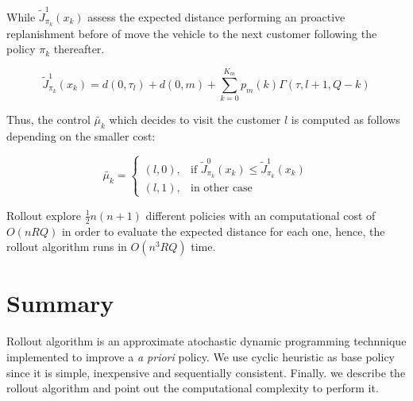 While $\tilde{J}^1_{\pi_k}(x_k)$ assess the expected distance performing an proactive replanishment before of move the vehicle to the next customer following the policy ${\pi_k}$ thereafter.

\begin{equation}\label{ra:Cost2Go1}%
 \tilde{J}^1_{\pi_k}(x_k)=d(0,\tau_l)+d(0,m)+\sum_{k=0}^{K_m}p_m(k)\Gamma(\tau,l+1,Q-k)
\end{equation}

Thus, the control $\tilde{\mu_k}$ which decides to visit the customer $l$ is computed as follows depending on the smaller cost:

\begin{equation}\label{eq:costg}
    \tilde{\mu_k} = \left \{ \begin{array}{ll}
    (l,0), & \text{if } \tilde{J}^0_{\pi_k}(x_k) \leq \tilde{J}^1_{\pi_k}(x_k)\\
    (l,1), & \text{in other case}
    \end{array} \right.
 \end{equation}



Rollout explore $\frac{1}{2}n(n+1)$ different policies with an computational cost of $O(nRQ)$ in order to evaluate the expected distance for each one, hence, the rollout algorithm runs in $O(n^3RQ)$ time.


\section{Summary}

Rollout algorithm is an approximate atochastic dynamic programming technnique implemented to improve a \textit{a priori} policy. We use cyclic heuristic as base policy since it is simple, inexpensive and sequentially consistent. Finally. we describe the rollout algorithm and point out the computational complexity to perform it.





